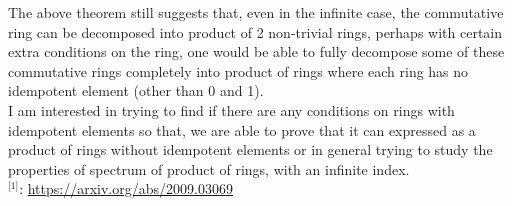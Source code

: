 \documentclass[11pt,a4paper]{colorart}
\begin{document}
The above theorem still suggests that, even in the infinite case, the commutative ring can be decomposed into product of 2 non-trivial rings, perhaps with certain extra conditions on the ring, one would be able to fully decompose some of these commutative rings completely into product of rings where each ring has no idempotent element (other than 0 and 1).\\

I am interested in trying to find if there are any conditions on rings with idempotent elements so that, we are able to prove that it can expressed as a product of rings without idempotent elements or in general trying to study the properties of spectrum of product of rings, with an infinite index.\\


$^\text{[1]}$: \href{https://arxiv.org/abs/2208.08828}{https://arxiv.org/abs/2009.03069}
\end{document}
